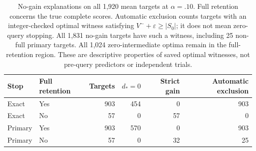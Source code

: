 \begin{table}[t]
\centering\small
\begin{tabular}{llrrrr}
\toprule
Stop & Full retention & Targets & $d_*=0$ & Strict gain & Automatic exclusion\\
\midrule
Exact & Yes & 903 & 454 & 0 & 903\\
Exact & No & 57 & 0 & 57 & 0\\
Primary & Yes & 903 & 570 & 0 & 903\\
Primary & No & 57 & 0 & 32 & 25\\
\bottomrule
\end{tabular}
\caption{No-gain explanations on all 1,920 mean targets at $\alpha=.10$. Full retention concerns the true complete scores. Automatic exclusion counts targets with an integer-checked optimal witness satisfying $V^-+\varepsilon\ge |S_0|$; it does not mean zero-query stopping. All 1,831 no-gain targets have such a witness, including 25 non-full primary targets. All 1,024 zero-intermediate optima remain in the full-retention region. These are descriptive properties of saved optimal witnesses, not pre-query predictors or independent trials.}
\label{tab:explanatory-overlap}
\end{table}
